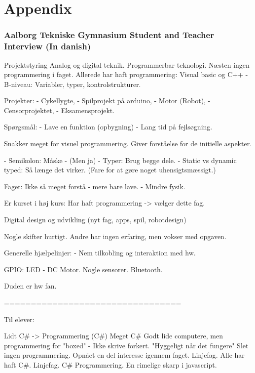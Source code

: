 \part{Appendix}



\section{Aalborg Tekniske Gymnasium Student and Teacher Interview (In danish)}
\label{Interviews}
Projektstyring
Analog og digital teknik.
Programmerbar teknologi.
Næsten ingen programmering i faget.
Allerede har haft programmering: Visual basic og C++
- B-niveau: Variabler, typer, kontrolstrukturer. 


Projekter:
- Cykellygte,
- Spilprojekt på arduino,
- Motor (Robot),
- Censorprojektet,
- Eksamensprojekt.

Spørgsmål: 
- Lave en funktion (opbygning)
- Lang tid på fejlsøgning.

Snakker meget for visuel programmering.
Giver forståelse for de initielle aspekter.


- Semikolon: Måske - (Men ja)
- Typer: Brug begge dele.
- Static vs dynamic typed: Så længe det virker. (Fare for at gøre noget uhensigtsmæssigt.)

Faget: Ikke så meget forstå - mere bare lave. - Mindre fysik.

Er kurset i høj kurs: Har haft programmering -> vælger dette fag.

Digital design og udvikling (nyt fag, apps, spil, robotdesign)

Nogle skifter hurtigt. Andre har ingen erfaring, men vokser med opgaven.

Generelle hjælpelinjer:
- Nem tilkobling og interaktion med hw.

GPIO: LED - DC Motor. Nogle sensorer. Bluetooth.

Duden er hw fan.

=================================

Til elever:

Lidt C{\#} -> Programmering (C{\#})
Meget C{\#}
Godt lide computere, men programmering for "boxed" - Ikke skrive forkert. 
"Hyggeligt når det fungere"
Slet ingen programmering.
Opnået en del interesse igennem faget.
Linjefag. Alle har haft C{\#}.
Linjefag. C{\#} Programmering.
En rimelige skarp i javascript.

